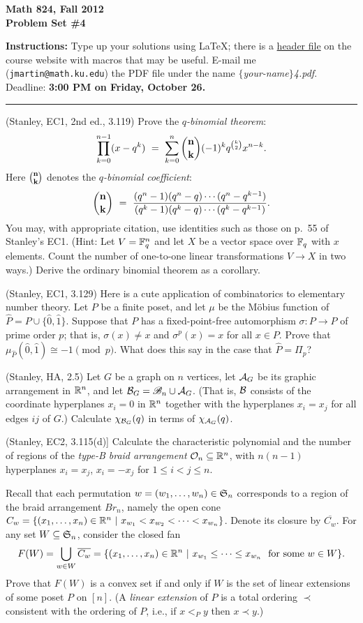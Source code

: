 

\thispagestyle{empty}
\textheight=9in
\parskip=9bp
\bf Math 824, Fall 2012\\
Problem Set \#4\rm

{\bf Instructions:} Type up your solutions using LaTeX; there is a
\href{http://www.jlmartin.faculty.ku.edu/math824/header.tex}{header file}
on the course website with macros that may be useful.
E-mail me (\texttt{jmartin@math.ku.edu}) the PDF file under the name \textsl{$\{$your-name$\}$4.pdf}.  Deadline: {\bf 3:00 PM on Friday, October 26.}
\smallskip\hrule

\prob (Stanley, EC1, 2nd ed., 3.119)  Prove the \emph{$q$-binomial theorem}:
  $$\prod_{k=0}^{n-1}(x-q^k) ~=~
    \sum_{k=0}^n \binom{\bf n}{\bf k} (-1)^k q^{\binom{k}{2}} x^{n-k}.$$
Here $\binom{\bf n}{\bf k}$ denotes the \emph{$q$-binomial coefficient}:
  $$\binom{\bf n}{\bf k} ~=~ \frac{(q^n-1)(q^n-q)\cdots(q^n-q^{k-1})}
    {(q^k-1)(q^k-q)\cdots(q^k-q^{k-1})}.$$
You may, with appropriate citation,
use identities such as those on p.~55 of Stanley's EC1.
(Hint: Let $V=\mathbb{F}_q^n$ and let $X$ be a vector
space over $\mathbb{F}_q$ with $x$ elements.  Count the number of one-to-one
linear transformations $V\to X$ in two ways.)  Derive the ordinary binomial
theorem as a corollary.

\prob (Stanley, EC1, 3.129) Here is a cute application of combinatorics to
elementary number theory.  Let $P$ be a finite poset,
and let $\mu$ be the M\"obius function of $\hat P=P\cup\{\hat0,\hat1\}$.
Suppose that $P$ has a fixed-point-free automorphism $\sigma:P\to P$
of prime order $p$; that is, $\sigma(x)\neq x$
and $\sigma^p(x)=x$  for all $x\in P$.  Prove
that $\mu_{\hat P}(\hat0,\hat1)\cong-1\pmod p$.  What does this say
in the case that $\hat P=\Pi_p$?

\prob (Stanley, HA, 2.5) Let $G$ be a graph on
$n$ vertices, let $\mathcal{A}_G$ be its graphic arrangement in $\mathbb{R}^n$,
and let $\mathcal{B}_G=\mathscr{B}_n\cup\mathcal{A}_G$.  (That is, $\mathcal{B}$ consists of the
coordinate hyperplanes $x_i=0$ in $\mathbb{R}^n$ together with the hyperplanes
$x_i=x_j$ for all edges $ij$ of $G$.)  Calculate $\chi_{\mathcal{B}_G}(q)$
in terms of $\chi_{\mathcal{A}_G}(q)$.

\prob (Stanley, EC2, 3.115(d)]
Calculate the characteristic polynomial and the number of regions
of the \emph{type-B braid arrangement} $\mathcal{O}_n\subseteq\mathbb{R}^n$,
with $n(n-1)$ hyperplanes $x_i=x_j$, $x_i=-x_j$ for $1\leq i<j\leq n$.

\prob
Recall that each permutation $w=(w_1,\dots,w_n)\in\mathfrak{S}_n$ corresponds
to a region of the braid arrangement $Br_n$, namely the open cone
$C_w=\{(x_1,\dots,x_n)\in\mathbb{R}^n~|~ x_{w_1}<x_{w_2}<\dots<x_{w_n}\}$.
Denote its closure by $\overline{C_w}$.  For any set
$W\subseteq\mathfrak{S}_n$, consider the closed fan
  \[F(W) = \bigcup_{w\in W} \overline{C_w} = \{(x_1,\dots,x_n)\in\mathbb{R}^n~|~
  x_{w_1}\leq\dots\leq x_{w_n}\ \text{ for some } w\in W\}.\]
Prove that $F(W)$ is a convex set if and only if
$W$ is the set of linear extensions of some poset $P$ on $[n]$.
(A \emph{linear extension} of $P$ is a total
ordering $\prec$ consistent with the ordering of $P$, i.e., if $x<_Py$
then $x\prec y$.)


